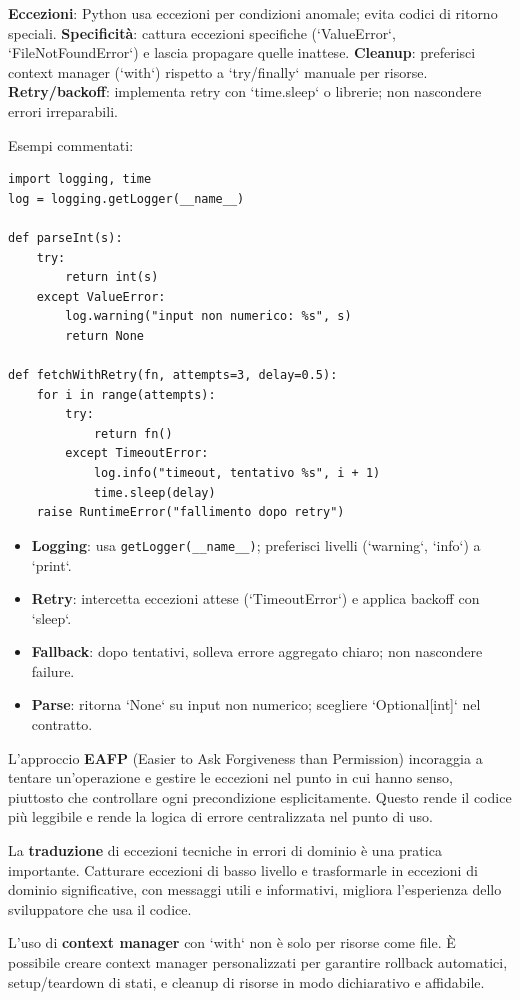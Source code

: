 \begin{tcolorbox}[title={Per chi viene da C/Java/JS: modello eccezioni, retry e logging}]
\textbf{Eccezioni}: Python usa eccezioni per condizioni anomale; evita codici di ritorno speciali.  
\textbf{Specificità}: cattura eccezioni specifiche (`ValueError`, `FileNotFoundError`) e lascia propagare quelle inattese.  
\textbf{Cleanup}: preferisci context manager (`with`) rispetto a `try/finally` manuale per risorse.  
\textbf{Retry/backoff}: implementa retry con `time.sleep` o librerie; non nascondere errori irreparabili.

Esempi commentati:
\begin{lstlisting}
import logging, time
log = logging.getLogger(__name__)

def parseInt(s):
    try:
        return int(s)
    except ValueError:
        log.warning("input non numerico: %s", s)
        return None

def fetchWithRetry(fn, attempts=3, delay=0.5):
    for i in range(attempts):
        try:
            return fn()
        except TimeoutError:
            log.info("timeout, tentativo %s", i + 1)
            time.sleep(delay)
    raise RuntimeError("fallimento dopo retry")
\end{lstlisting}
\begin{tcolorbox}[title=Spiegazione del codice]
\begin{itemize}
  \item \textbf{Logging}: usa \verb|getLogger(__name__)|; preferisci livelli (`warning`, `info`) a `print`.
  \item \textbf{Retry}: intercetta eccezioni attese (`TimeoutError`) e applica backoff con `sleep`.
  \item \textbf{Fallback}: dopo tentativi, solleva errore aggregato chiaro; non nascondere failure.
  \item \textbf{Parse}: ritorna `None` su input non numerico; scegliere `Optional[int]` nel contratto.
\end{itemize}
\end{tcolorbox}
\end{tcolorbox}

\begin{tcolorbox}[title={Idiomi: EAFP, traduzione errori, context manager}]
L'approccio \textbf{EAFP} (Easier to Ask Forgiveness than Permission) incoraggia a tentare un'operazione e gestire le eccezioni nel punto in cui hanno senso, piuttosto che controllare ogni precondizione esplicitamente. Questo rende il codice più leggibile e rende la logica di errore centralizzata nel punto di uso.

La \textbf{traduzione} di eccezioni tecniche in errori di dominio è una pratica importante. Catturare eccezioni di basso livello e trasformarle in eccezioni di dominio significative, con messaggi utili e informativi, migliora l'esperienza dello sviluppatore che usa il codice.

L'uso di \textbf{context manager} con `with` non è solo per risorse come file. È possibile creare context manager personalizzati per garantire rollback automatici, setup/teardown di stati, e cleanup di risorse in modo dichiarativo e affidabile.
\end{tcolorbox}

